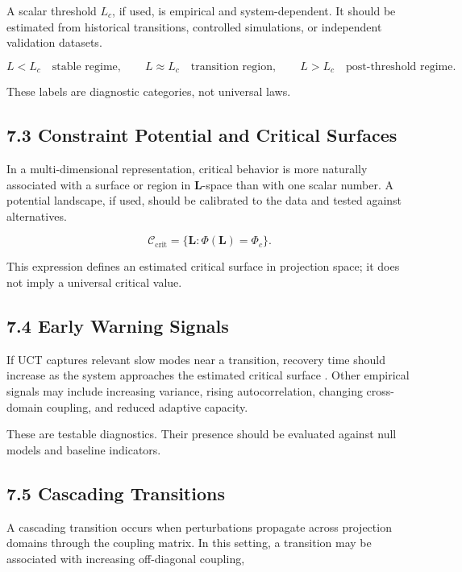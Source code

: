 \documentclass[aps,pre,reprint,superscriptaddress,nofootinbib]{revtex4-2}
\begin{document}
A scalar threshold \(L_c\), if used, is empirical and system-dependent. It should be estimated from historical transitions, controlled simulations, or independent validation datasets.

\[ L<L_c \quad \text{stable regime}, \qquad L\approx L_c \quad \text{transition region}, \qquad L>L_c \quad \text{post-threshold regime}. \]

These labels are diagnostic categories, not universal laws.

\subsection{7.3 Constraint Potential and Critical Surfaces}

In a multi-dimensional representation, critical behavior is more naturally associated with a surface or region in \(\mathbf{L}\)-space than with one scalar number. A potential landscape, if used, should be calibrated to the data and tested against alternatives.

\[ \mathcal{C}_{\mathrm{crit}}=\{\mathbf{L}: \Phi(\mathbf{L})=\Phi_c\}. \]

This expression defines an estimated critical surface in projection space; it does not imply a universal critical value.

\subsection{7.4 Early Warning Signals}

If UCT captures relevant slow modes near a transition, recovery time should increase as the system approaches the estimated critical surface \cite{Scheffer2009EarlyWarning,Dakos2008Slowing}. Other empirical signals may include increasing variance, rising autocorrelation, changing cross-domain coupling, and reduced adaptive capacity.

These are testable diagnostics. Their presence should be evaluated against null models and baseline indicators.

\subsection{7.5 Cascading Transitions}

A cascading transition occurs when perturbations propagate across projection domains through the coupling matrix. In this setting, a transition may be associated with increasing off-diagonal coupling,
\end{document}
